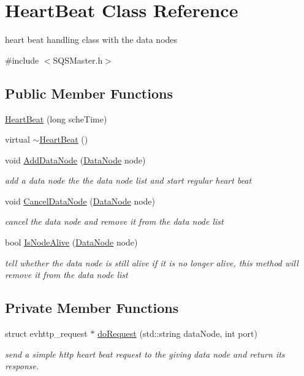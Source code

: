 \hypertarget{classHeartBeat}{\section{\-Heart\-Beat \-Class \-Reference}
\label{d7/d28/classHeartBeat}
}


heart beat handling class with the data nodes  




{\ttfamily \#include $<$\-S\-Q\-S\-Master.\-h$>$}

\subsection*{\-Public \-Member \-Functions}
\begin{DoxyCompactItemize}
\item 
\hyperlink{classHeartBeat_ab0b77e6af31793da01b8a6d99ac4999e}{\-Heart\-Beat} (long sche\-Time)
\item 
virtual \hyperlink{classHeartBeat_a8c6852870c1654cdd14af4d21362ade0}{$\sim$\-Heart\-Beat} ()
\item 
void \hyperlink{classHeartBeat_acd7815d9c021dac972ddd6e670cefcb8}{\-Add\-Data\-Node} (\hyperlink{classDataNode}{\-Data\-Node} node)
\begin{DoxyCompactList}\small\item\em add a data node the the data node list and start regular heart beat \end{DoxyCompactList}\item 
void \hyperlink{classHeartBeat_aeef6d5b3263f58fcd80f34570758a8c0}{\-Cancel\-Data\-Node} (\hyperlink{classDataNode}{\-Data\-Node} node)
\begin{DoxyCompactList}\small\item\em cancel the data node and remove it from the data node list \end{DoxyCompactList}\item 
bool \hyperlink{classHeartBeat_afaece774c2a5046dbb45fff2e452628b}{\-Is\-Node\-Alive} (\hyperlink{classDataNode}{\-Data\-Node} node)
\begin{DoxyCompactList}\small\item\em tell whether the data node is still alive if it is no longer alive, this method will remove it from the data node list \end{DoxyCompactList}\end{DoxyCompactItemize}
\subsection*{\-Private \-Member \-Functions}
\begin{DoxyCompactItemize}
\item 
struct evhttp\-\_\-request $\ast$ \hyperlink{classHeartBeat_a214003a874871f9757b62afeac63c504}{do\-Request} (std\-::string data\-Node, int port)
\begin{DoxyCompactList}\small\item\em send a simple http heart beat request to the giving data node and return its response. \end{DoxyCompactList}\end{DoxyCompactItemize}
